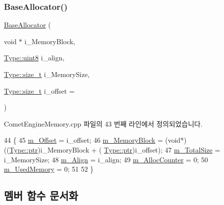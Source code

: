 \subsubsection{\texorpdfstring{Base\+Allocator()}{BaseAllocator()}}
{\footnotesize\ttfamily \hyperlink{class_comet_engine_1_1_core_1_1_memory_1_1_base_allocator}{Base\+Allocator} (\begin{DoxyParamCaption}\item[{void $\ast$}]{i\+\_\+\+Memory\+Block,  }\item[{\hyperlink{namespace_comet_engine_1_1_type_a1b09856a6463f2bcc4bd8ff0e4e3ee0f}{Type\+::uint8}}]{i\+\_\+align,  }\item[{\hyperlink{namespace_comet_engine_1_1_type_a7c94ea6f8948649f8d181ae55911eeaf}{Type\+::size\+\_\+t}}]{i\+\_\+\+Memory\+Size,  }\item[{\hyperlink{namespace_comet_engine_1_1_type_a7c94ea6f8948649f8d181ae55911eeaf}{Type\+::size\+\_\+t}}]{i\+\_\+offset = {} }\end{DoxyParamCaption})\hspace{0.3cm}{\ttfamily [protected]}}



Comet\+Engine\+Memory.\+cpp 파일의 43 번째 라인에서 정의되었습니다.


\begin{DoxyCode}
44 \{
45     \hyperlink{class_comet_engine_1_1_core_1_1_memory_1_1_base_allocator_a71e2142fb28745ce9bc64de3a0ea1956}{m\_Offset} = i\_offset;
46     \hyperlink{class_comet_engine_1_1_core_1_1_memory_1_1_base_allocator_a24b4bdf45e7f4b6109b6d1cc455c6f26}{m\_MemoryBlock} = (\textcolor{keywordtype}{void}*)((\hyperlink{namespace_comet_engine_1_1_type_aeb22ad46de677e9a50679dfebeb0e6f0}{Type::ptr})i\_MemoryBlock + (
      \hyperlink{namespace_comet_engine_1_1_type_aeb22ad46de677e9a50679dfebeb0e6f0}{Type::ptr})i\_offset);
47     \hyperlink{class_comet_engine_1_1_core_1_1_memory_1_1_base_allocator_abba9914681f05b98a55770daaf7d94be}{m\_TotalSize} = i\_MemorySize;
48     \hyperlink{class_comet_engine_1_1_core_1_1_memory_1_1_base_allocator_a01f973630e3c1ac98b9defda193793b8}{m\_Align} = i\_align;
49     \hyperlink{class_comet_engine_1_1_core_1_1_memory_1_1_base_allocator_abed7f06b465ee178701fe2cfc1aff9a6}{m\_AllocCounter} = 0;
50     \hyperlink{class_comet_engine_1_1_core_1_1_memory_1_1_base_allocator_a1420047b91508f9ab33c448e8371511c}{m\_UsedMemory} = 0;
51 
52 \}
\end{DoxyCode}


\subsection{멤버 함수 문서화}
\mbox{\label{class_comet_engine_1_1_core_1_1_memory_1_1_base_allocator_a8f51b4daa12e31477f57003494c09098}} 
